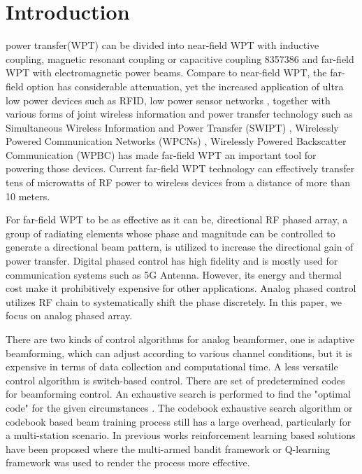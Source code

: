 \documentclass[journal]{IEEEtran}
\begin{document}
\section{Introduction}
 power transfer(WPT) can be divided into near-field WPT with inductive coupling, magnetic resonant coupling or capacitive coupling {8357386} and far-field WPT with electromagnetic power beams. \cite{8246215} Compare to near-field WPT, the far-field option has considerable attenuation,  yet the increased application of ultra low power devices such as RFID, low power sensor networks \cite{7578025}, together with various forms of joint wireless information and power transfer technology such as Simultaneous Wireless Information and Power Transfer (SWIPT) \cite{8214104}, Wirelessly Powered Communication Networks (WPCNs) \cite{7462480}, Wirelessly Powered Backscatter Communication (WPBC) \cite{7842391} has made far-field WPT an important tool for powering those devices. Current far-field WPT technology can effectively transfer tens of microwatts of RF power to wireless devices from a distance of more than 10 meters. \cite{7462480}

For far-field WPT to be as effective as it can be, directional RF phased array, a group of radiating elements whose phase and magnitude can be controlled to generate a directional beam pattern, \cite{665} is utilized to increase the directional gain of power transfer. Digital phased control has high fidelity and is mostly used for communication systems such as 5G Antenna. However, its energy and thermal cost make it prohibitively expensive for other applications. Analog phased control utilizes RF chain to systematically shift the phase discretely. In this paper, we focus on analog phased array.

There are two kinds of control algorithms for analog beamformer, one is adaptive beamforming, which can adjust according to various channel conditions, but it is expensive in terms of data collection and computational time. A less versatile control algorithm is switch-based control. There are set of predetermined codes for beamforming control. An exhaustive search is performed to find the "optimal code" for the given circumstances\cite{5262295} \cite{1237152}. The codebook exhaustive search algorithm or codebook based beam training process still has a large overhead, particularly for a multi-station scenario. In previous works reinforcement learning based solutions have been proposed where the multi-armed bandit framework \cite{8662770} or Q-learning framework \cite{Cui2019SecureWC} was used to render the process more effective.
\end{document}

